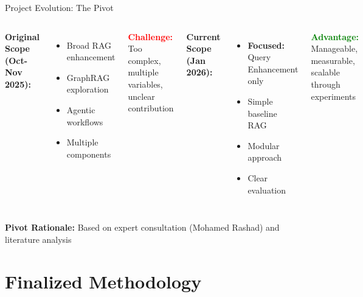 \documentclass[aspectratio=169]{beamer}
\begin{document}
\begin{frame}{Project Evolution: The Pivot}
\begin{columns}
\textbf{Original Scope (Oct-Nov 2025):}
\begin{itemize}
    \item Broad RAG enhancement
    \item GraphRAG exploration
    \item Agentic workflows
    \item Multiple components
\end{itemize}

\vspace{0.3cm}
\textcolor{red}{\textbf{Challenge:}} Too complex, multiple variables, unclear contribution

\textbf{Current Scope (Jan 2026):}
\begin{itemize}
    \item \textbf{Focused:} Query Enhancement only
    \item Simple baseline RAG
    \item Modular approach
    \item Clear evaluation
\end{itemize}

\vspace{0.3cm}
\textcolor{green}{\textbf{Advantage:}} Manageable, measurable, scalable through experiments
\end{columns}

\vspace{0.5cm}
\textbf{Pivot Rationale:} Based on expert consultation (Mohamed Rashad) and literature analysis
\end{frame}

\section{Finalized Methodology}
\end{document}
